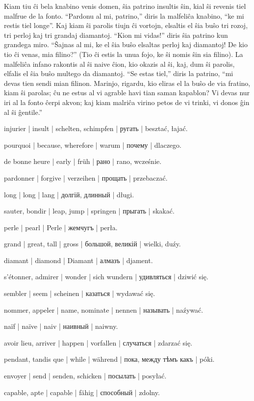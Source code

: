 
Kiam tiu ĉi bela knabino venis domen, ŝia patrino insultis ŝin, kial ŝi revenis tiel malfrue de la fonto. “Pardonu al mi, patrino,” diris la malfeliĉa knabino, “ke mi restis tiel longe”. Kaj kiam ŝi parolis tiujn ĉi vortojn, elsaltis el ŝia buŝo tri rozoj, tri perloj kaj tri grandaj diamantoj. “Kion mi vidas!” diris ŝia patrino kun grandega miro. “Ŝajnas al mi, ke el ŝia buŝo elsaltas perloj kaj diamantoj! De kio tio ĉi venas, mia filino?” (Tio ĉi estis la unua fojo, ke ŝi nomis ŝin sia filino). La malfeliĉa infano rakontis al ŝi naive ĉion, kio okazis al ŝi, kaj, dum ŝi parolis, elfalis el ŝia buŝo multego da diamantoj. “Se estas tiel,” diris la patrino, “mi devas tien sendi mian filinon. Marinjo, rigardu, kio eliras el la buŝo de via fratino, kiam ŝi parolas; ĉu ne estus al vi agrable havi tian saman kapablon? Vi devas nur iri al la fonto ĉerpi akvon; kaj kiam malriĉa virino petos de vi trinki, vi donos ĝin al ŝi ĝentile.”

\begin{ekzvocab}{1em}
 injurier | insult | schelten, schimpfen | ругать | besztać, łajać.

 pourquoi | because, wherefore | warum | почему | dlaczego.

 de bonne heure | early | früh | рано | rano, wcześnie.

 pardonner | forgive | verzeihen | прощать | przebaczać.

 long | long | lang | долгій, длинный | długi.

 sauter, bondir | leap, jump | springen | прыгать | skakać.

 perle | pearl | Perle | жемчугъ | perła.

 grand | great, tall | gross | большой, великій | wielki, duźy.

 diamant | diamond | Diamant | алмазъ | djament.

 s’étonner, admirer | wonder | sich wundern | удивляться | dziwić się.

 sembler | seem | scheinen | казаться | wydawać się.

 nommer, appeler | name, nominate | nennen | называть | naźywać.

 naïf | naïve | naiv | наивный | naiwny.

 avoir lieu, arriver | happen | vorfallen | случаться | zdarzać się.

 pendant, tandis que | while | während | пока, между тѣмъ какъ | póki.

 envoyer | send | senden, schicken | посылать | posyłać.

 capable, apte | capable | fähig | способный | zdolny.

\end{ekzvocab}


